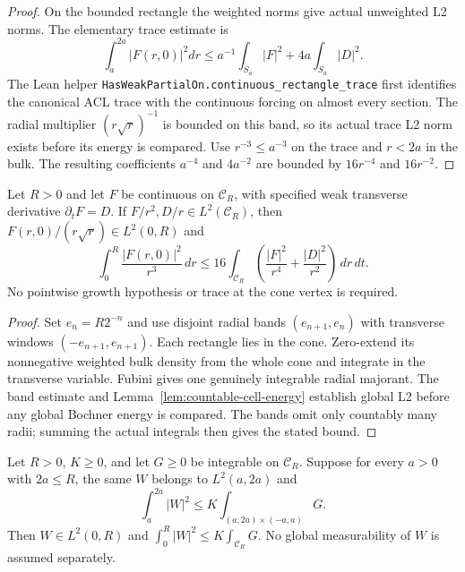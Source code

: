 \begin{proof}
\leanok
On the bounded rectangle the weighted norms give actual unweighted L2 norms.
The elementary trace estimate is
\[
 \int_a^{2a}|F(r,0)|^2dr
 \le a^{-1}\int_{S_a}|F|^2+4a\int_{S_a}|D|^2.
\]
The Lean helper
\texttt{HasWeakPartialOn.continuous\_rectangle\_trace} first identifies
the canonical ACL trace with the continuous forcing on almost every section.
The radial multiplier $(r\sqrt r)^{-1}$ is bounded on this band,
so its actual trace L2 norm exists before its energy is compared.
Use $r^{-3}\le a^{-3}$ on the trace and $r<2a$ in the bulk.
The resulting coefficients $a^{-4}$ and $4a^{-2}$ are bounded by
$16r^{-4}$ and $16r^{-2}$.
\end{proof}

\begin{lemma}
\label{lem:weighted-cone-trace}
\leanok
Let $R>0$ and let $F$ be continuous on $\mathcal C_R$, with specified
weak transverse derivative $\partial_tF=D$.
If $F/r^2,D/r\in L^2(\mathcal C_R)$, then
$F(r,0)/(r\sqrt r)\in L^2(0,R)$ and
\[
 \int_0^R\frac{|F(r,0)|^2}{r^3}\,dr
 \le16\int_{\mathcal C_R}\left(\frac{|F|^2}{r^4}
                                  +\frac{|D|^2}{r^2}\right)\,dr\,dt.
\]
No pointwise growth hypothesis or trace at the cone vertex is required.
\end{lemma}

\begin{proof}
\leanok
Set $e_n=R2^{-n}$ and use disjoint radial bands
$(e_{n+1},e_n)$ with transverse windows $(-e_{n+1},e_{n+1})$.
Each rectangle lies in the cone. Zero-extend its nonnegative weighted
bulk density from the whole cone and integrate in the transverse variable.
Fubini gives one genuinely integrable radial majorant.
The band estimate and Lemma~\ref{lem:countable-cell-energy}
establish global L2 before any global Bochner energy is compared.
The bands omit only countably many radii; summing the actual integrals
then gives the stated bound.
\end{proof}

\begin{lemma}
\label{lem:cone-band-energy}
\leanok
Let $R>0$, $K\ge0$, and let $G\ge0$ be integrable on $\mathcal C_R$.
Suppose for every $a>0$ with $2a\le R$, the same $W$ belongs to
$L^2(a,2a)$ and
\[
 \int_a^{2a}|W|^2\le K\int_{(a,2a)\times(-a,a)}G.
\]
Then $W\in L^2(0,R)$ and
$\int_0^R|W|^2\le K\int_{\mathcal C_R}G$.
No global measurability of $W$ is assumed separately.
\end{lemma}

